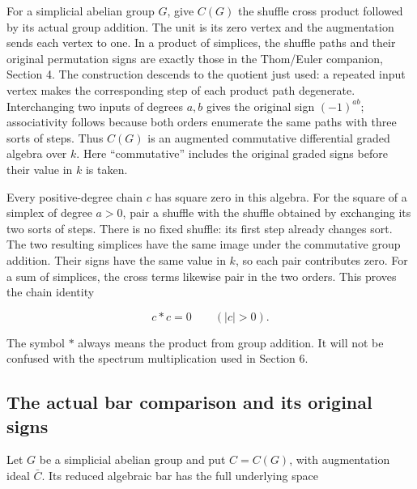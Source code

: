 For a simplicial abelian group \(G\), give \(C(G)\) the shuffle cross product followed by its actual group addition. The unit is its zero vertex and the augmentation sends each vertex to one. In a product of simplices, the shuffle paths and their original permutation signs are exactly those in the Thom/Euler companion, Section 4. The construction descends to the quotient just used: a repeated input vertex makes the corresponding step of each product path degenerate. Interchanging two inputs of degrees \(a,b\) gives the original sign \((-1)^{ab}\); associativity follows because both orders enumerate the same paths with three sorts of steps. Thus \(C(G)\) is an augmented commutative differential graded algebra over \(k\). Here ``commutative'' includes the original graded signs before their value in \(k\) is taken.

Every positive-degree chain \(c\) has square zero in this algebra. For the square of a simplex of degree \(a>0\), pair a shuffle with the shuffle obtained by exchanging its two sorts of steps. There is no fixed shuffle: its first step already changes sort. The two resulting simplices have the same image under the commutative group addition. Their signs have the same value in \(k\), so each pair contributes zero. For a sum of simplices, the cross terms likewise pair in the two orders. This proves the chain identity

\begin{equation}
c\ast c=0\qquad(|c|>0).
\label{courseIII:the-actual-mod-two-cooperation-comparison-through-degree-eight:eq:1.3}
\end{equation}

The symbol \(\ast\) always means the product from group addition. It will not be confused with the spectrum multiplication used in Section 6.

\subsection{The actual bar comparison and its original signs}
\label{courseIII:the-actual-mod-two-cooperation-comparison-through-degree-eight:actual-eight-bar-comparison}

\label{courseIII:the-actual-mod-two-cooperation-comparison-through-degree-eight:section-2}\label{courseIII:actual-degree8:2}

Let \(G\) be a simplicial abelian group and put \(C=C(G)\), with augmentation ideal \(\bar C\). Its reduced algebraic bar has the full underlying space


